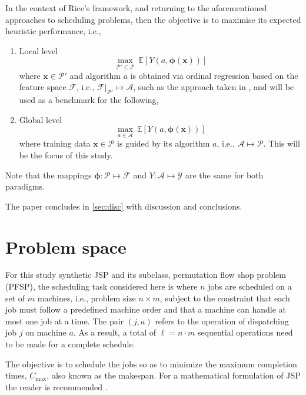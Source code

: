 \documentclass[graybox]{svmult}
\renewcommand{\vec}[1]{\mathbf{#1}}
\newcommand{\vphi}{{\boldsymbol{\phi}}}
\begin{document}
In the context of Rice's framework, and returning to the aforementioned 
approaches to scheduling problems, then the objective is to maximise its 
expected heuristic performance, i.e.,
\begin{enumerate} 
\item Local level 
\begin{equation}
    \max_{\mathcal{P}'\subset\mathcal{P}}~\mathbb{E}\left[Y\left(a,\vphi(\vec{x})\right)\right]
\end{equation}where $\vec{x}\in\mathcal{P}'$ and algorithm $a$ is obtained via 
ordinal regression based on the feature space $\mathcal{F}$, i.e., 
$\mathcal{F}|_{\mathcal{P}'}\mapsto\mathcal{A}$, such as the approach taken in 
\cite{InRu11a}, and  will be used as a benchmark for the following,  
\item  Global level
\begin{equation}
    \max_{a\in\mathcal{A}}~\mathbb{E}\left[Y\left(a,\vphi(\vec{x})\right)\right]
\end{equation}
where training data $\vec{x}\in\mathcal{P}$ is guided by its algorithm $a$, 
i.e., $\mathcal{A}\mapsto\mathcal{P}$. This will be the focus of this study.
\end{enumerate}
Note that the mappings $\vphi:\mathcal{P}\mapsto\mathcal{F}$ and 
$Y:\mathcal{A}\mapsto\mathcal{Y}$ are the same for both paradigms.

The paper concludes in \cref{sec:disc} with discussion and conclusions.


\section{Problem space}\label{sec:data}
For this study synthetic JSP and its subclass, permutation flow shop problem 
(PFSP), the scheduling task considered here is where $n$ jobs are scheduled on 
a set of $m$ machines, i.e., problem size $n\times m$, subject to the 
constraint that each job must follow a predefined machine order and that a 
machine can handle at most one job at a time. The pair $(j,a)$ refers to the 
operation of dispatching job $j$ on machine $a$. As a result, a total of $\ell 
= n\cdot m$ sequential operations need to be made for a complete schedule.

The objective is to schedule the jobs so as to minimize the maximum completion 
times, $C_{\max}$, also known as the makespan.  For a mathematical formulation 
of JSP the reader is recommended \cite{InRu11a}. 
\end{document}
